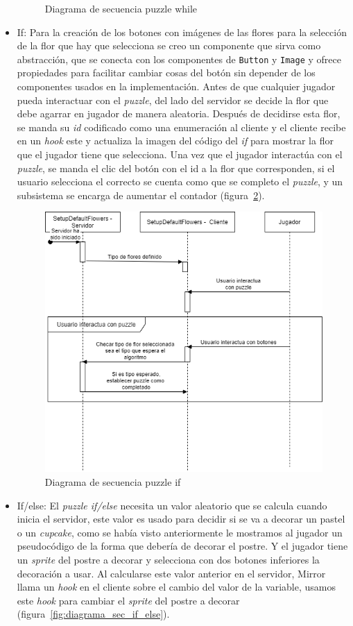 \begin{itemize}
\begin{figure}[H]
        \caption{Diagrama de secuencia puzzle while}
        \label{fig:diagrama_sec_while}
    \end{figure}
    \item If: Para la creación de los botones con imágenes de las flores para la selección de la flor que hay que selecciona se creo un componente que sirva como abstracción, que se conecta con los componentes de \texttt{Button} y \texttt{Image} y ofrece propiedades para facilitar cambiar cosas del botón sin depender de los componentes usados en la implementación. 
    Antes de que cualquier jugador pueda interactuar con el \textit{puzzle}, del lado del servidor se decide la flor que debe agarrar en jugador de manera aleatoria. Después de decidirse esta flor, se manda su \textit{id} codificado como una enumeración al cliente y el cliente recibe en un \textit{hook} este y actualiza la imagen del código del \textit{if} para mostrar la flor que el jugador tiene que selecciona. 
    Una vez que el jugador interactúa con el \textit{puzzle}, se manda el clic del botón con el id a la flor que corresponden, si el usuario selecciona el correcto se cuenta como que se completo el \textit{puzzle}, y un subsistema se encarga de aumentar el contador (figura~\ref{fig:diagrama_sec_if}).
    \begin{figure}[H]
        \centering
        \includegraphics[width=0.8\linewidth]{images/DiagramaSecuenciaPuzzleIf.png}
        \caption{Diagrama de secuencia puzzle if}
        \label{fig:diagrama_sec_if}
    \end{figure}
    \item If/else: El \textit{puzzle if/else} necesita un valor aleatorio que se calcula cuando inicia el servidor, este valor es usado para decidir si se va a decorar un pastel o un \textit{cupcake}, como se había visto anteriormente le mostramos al jugador un pseudocódigo de la forma que debería de decorar el postre. Y el jugador tiene un \textit{sprite} del postre a decorar y selecciona con dos botones inferiores la decoración a usar. Al calcularse este valor anterior en el servidor, Mirror llama un \textit{hook} en el cliente sobre el cambio del valor de la variable, usamos este \textit{hook} para cambiar el \textit{sprite} del postre a decorar (figura~\ref{fig:diagrama_sec_if_else}).

\end{itemize}

